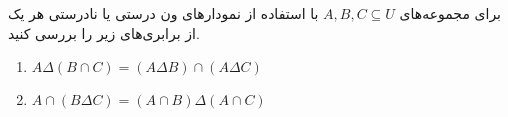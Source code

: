 برای مجموعه‌های $A,B,C \subseteq U$ با استفاده از نمودارهای ون درستی یا نادرستی هر یک از برابری‌های زیر را بررسی کنید.

\begin{enumerate}
	\item[] $A \Delta (B \cap C) = (A \Delta B) \cap (A \Delta C)$
	\item[] $A \cap (B \Delta C) = (A \cap B) \Delta (A \cap C)$
\end{enumerate}